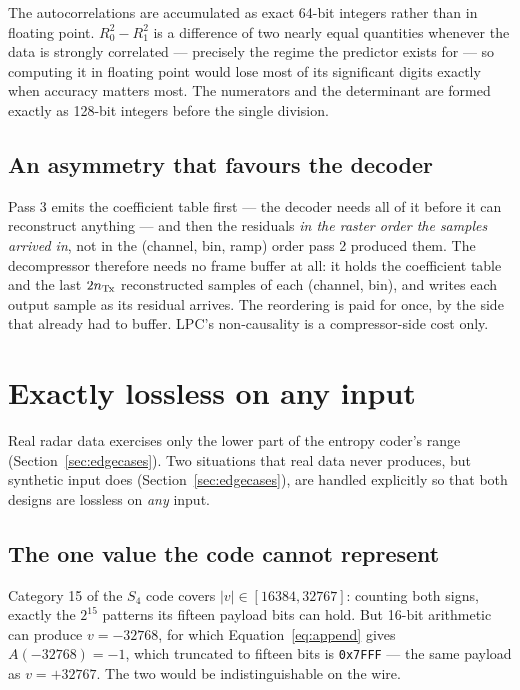 The autocorrelations are accumulated as exact 64-bit integers rather than in
floating point. $R_0^2 - R_1^2$ is a difference of two nearly equal quantities
whenever the data is strongly correlated --- precisely the regime the predictor
exists for --- so computing it in floating point would lose most of its
significant digits exactly when accuracy matters most. The numerators and the
determinant are formed exactly as 128-bit integers before the single division.

\subsection{An asymmetry that favours the decoder}

Pass 3 emits the coefficient table first --- the decoder needs all of it before
it can reconstruct anything --- and then the residuals \emph{in the raster
order the samples arrived in}, not in the (channel, bin, ramp) order pass 2
produced them. The decompressor therefore needs no frame buffer at all: it holds
the coefficient table and the last $2n_{\mathrm{Tx}}$ reconstructed samples of each
(channel, bin), and writes each output sample as its residual arrives. The
reordering is paid for once, by the side that already had to buffer. LPC's
non-causality is a compressor-side cost only.

\section{Exactly lossless on any input}
\label{sec:robust}

Real radar data exercises only the lower part of the entropy coder's range
(Section~\ref{sec:edgecases}). Two situations that real data never produces, but synthetic input does
(Section~\ref{sec:edgecases}), are handled explicitly so that both designs are
lossless on \emph{any} input.

\subsection{The one value the code cannot represent}

Category 15 of the $S_4$ code covers $|v| \in [16384, 32767]$: counting both
signs, exactly the $2^{15}$ patterns its fifteen payload bits can hold. But
16-bit arithmetic can produce $v = -32768$, for which
Equation~\eqref{eq:append} gives $A(-32768) = -1$, which truncated to fifteen
bits is \texttt{0x7FFF} --- the same payload as $v = +32767$. The two would be
indistinguishable on the wire.

